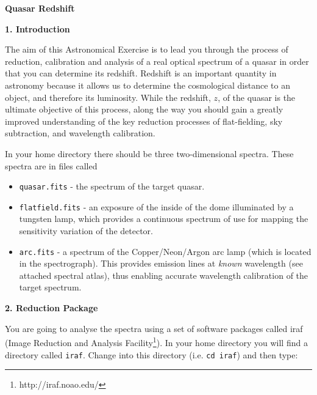 \pagestyle{myheadings}
\setcounter{page}{1}

\begin{center}
{\Huge\bf Quasar Redshift}
\end{center}

\vspace{0.3cm}

{\large {\bf 1. Introduction}}

The aim of this Astronomical Exercise is to lead you through the process
of reduction, calibration and analysis of a real optical spectrum of a quasar 
in order that you can determine its redshift. Redshift is an important
quantity in astronomy because it allows us to determine the 
cosmological distance to an object, and therefore its luminosity.
While the redshift, $z$, of
the quasar is the ultimate objective of this process, along the way you
should gain a greatly improved understanding of the key reduction processes
of flat-fielding, sky subtraction, and wavelength calibration.

In your home directory there should be three two-dimensional spectra. 
These spectra are in files called
\begin{itemize}

\item{{\tt quasar.fits} - the spectrum of the target quasar.}

\item{{\tt flatfield.fits} - an exposure of the
inside of the dome illuminated by a tungsten lamp, which provides a
continuous spectrum of use for mapping the sensitivity variation of the
detector.} %

\item{{\tt arc.fits} - a spectrum of the Copper/Neon/Argon arc lamp (which
is located in the spectrograph). This provides emission lines at {\em
known} wavelength (see attached spectral atlas), thus enabling accurate
wavelength calibration of the target spectrum.}

\end{itemize}

{\large {\bf 2. Reduction Package}}

You are going to analyse the spectra using a set of software packages 
called {\sc iraf} (Image Reduction and Analysis
Facility\footnote{http://iraf.noao.edu/}). In your home directory you
will find a directory called {\tt iraf}. Change into this directory
(i.e. {\tt cd iraf}) and then type:

